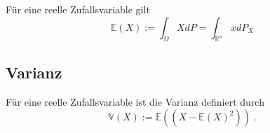 \begin{Satz}
Für eine reelle Zufallsvariable gilt
$$ \mathbb{E} (X) := \int_{\Omega} X dP = \int_{\mathbb{R}^n}  x  dP_X$$
\end{Satz}

\subsection{Varianz}



\begin{Definition}
Für eine reelle Zufallsvariable ist die Varianz definiert durch
$$ \mathbb{V} (X) :=  \mathbb{E}( (X - \mathbb{E}(X)^2)) \; .$$
\end{Definition}




